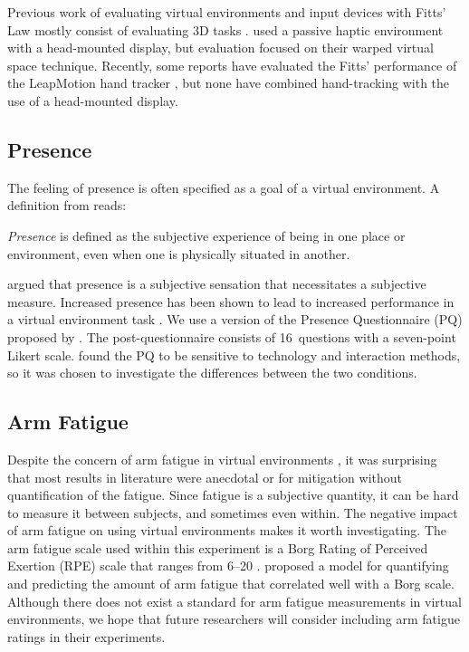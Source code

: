 Previous work of evaluating virtual environments and input devices with Fitts’ Law mostly consist of evaluating 3D tasks \citep{chun_evaluating_2004,liu_comparing_2009,teather_evaluating_2010}.
\citet{kohli_redirected_2012} used a passive haptic environment with a head-mounted display, but evaluation focused on their warped virtual space technique.
Recently, some reports have evaluated the Fitts’ performance of the LeapMotion hand tracker \citep{coelho_pointing_2014,seixas_one_2015}, but none have combined hand-tracking with the use of a head-mounted display.

\subsection{Presence}

The feeling of presence is often specified as a goal of a virtual environment.
A definition from \citet{witmer_measuring_1998} reads:
\begin{displayquote}
\textit{Presence} is defined as the subjective experience of being in one place or environment, even when one is physically situated in another.
\end{displayquote}
\citet{sheridan_musings_1992} argued that presence is a subjective sensation that necessitates a subjective measure.
Increased presence has been shown to lead to increased performance in a virtual environment task \citep{youngblut_relationship_2003}.
We use a version of the Presence Questionnaire (PQ) proposed by \citet{witmer_measuring_1998}.
The post-questionnaire consists of 16~questions with a seven-point Likert scale.
\citet{nystad_comparison_2004} found the PQ to be sensitive to technology and interaction methods, so it was chosen to investigate the differences between the two conditions.

\subsection{Arm Fatigue}

Despite the concern of arm fatigue in virtual environments \citep{burdea_virtual_2003}, it was surprising that most results in literature were anecdotal or for mitigation without quantification of the fatigue.
Since fatigue is a subjective quantity, it can be hard to measure it between subjects, and sometimes even within.
The negative impact of arm fatigue on using virtual environments makes it worth investigating.
The arm fatigue scale used within this experiment is a Borg Rating of Perceived Exertion (RPE) scale that ranges from \numrange{6}{20} \citep{borg_borgs_1998}.
\citet{hincapie-ramos_consumed_2014} proposed a model for quantifying and predicting the amount of arm fatigue that correlated well with a Borg scale.
Although there does not exist a standard for arm fatigue measurements in virtual environments, we hope that future researchers will consider including arm fatigue ratings in their experiments.

